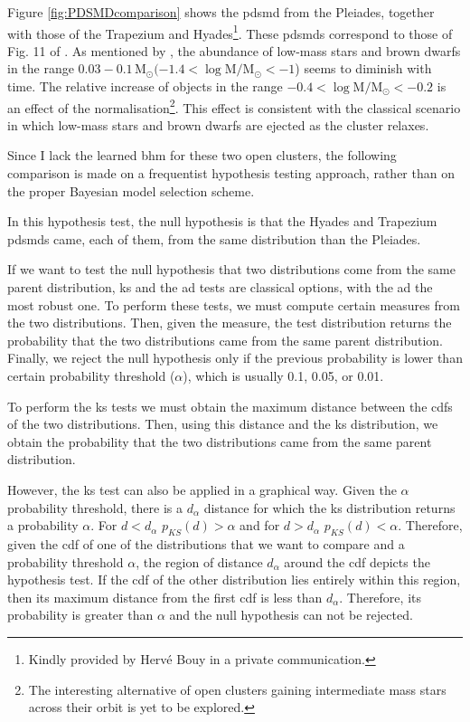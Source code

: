 Figure \ref{fig:PDSMDcomparison} shows the \gls{pdsmd} from the Pleiades, together with those of the Trapezium and Hyades\footnote{Kindly provided by Herv\'e Bouy in a private communication.}. These \glspl{pdsmd} correspond to those of  Fig. 11 of \citet{Bouy2015}. As mentioned by \citet{Bouy2015}, the abundance of low-mass stars and brown dwarfs in the range $0.03 - 0.1\,\mathrm{M_{\odot}}(-1.4 < \log \mathrm{M/M_{\odot}} <-1$) seems to diminish with time. The relative increase of objects in the range $-0.4 < \mathrm{\log M/M_{\odot}} < -0.2$ is an effect of the normalisation\footnote{The interesting alternative of open clusters gaining intermediate mass stars across their orbit is yet to be explored.}. This effect is consistent with the classical scenario in which low-mass stars and brown dwarfs are ejected as the cluster relaxes.

Since I lack the learned \gls{bhm} for these two open clusters, the following comparison is made on a frequentist hypothesis testing approach, rather than on the proper Bayesian model selection scheme.

In this hypothesis test, the null hypothesis is that the Hyades and Trapezium \glspl{pdsmd} came, each of them, from the same distribution than the Pleiades. 

If we want to test the null hypothesis that two distributions come from the same parent distribution, \gls{ks} and the \gls{ad} tests are classical options, with the \gls{ad} the most robust one. To perform these tests, we must compute certain measures from the two distributions. Then, given the measure, the test distribution returns the probability that the two distributions came from the same parent distribution. Finally, we reject the null hypothesis only if the previous probability is lower than certain probability threshold ($\alpha$), which is usually 0.1, 0.05, or 0.01. 

To perform the \gls{ks} tests we must obtain the maximum distance between the \glspl{cdf} of the two distributions. Then, using this distance and the \gls{ks} distribution, we obtain the probability that the two distributions came from the same parent distribution. %

However, the \gls{ks} test can also be applied in a graphical way. Given the $\alpha$ probability threshold, there is a $d_{\alpha}$ distance for which the \gls{ks} distribution returns a probability $\alpha$. For $d < d_{\alpha}$ $p_{KS}(d) > \alpha$ and for $d > d_{\alpha}$ $p_{KS}(d) < \alpha$. Therefore, given the \gls{cdf} of one of the distributions that we want to compare and a probability threshold $\alpha$, the region of distance $d_{\alpha}$ around the \gls{cdf} depicts the hypothesis test. If the \gls{cdf} of the other distribution lies entirely within this region, then its maximum distance from the first \gls{cdf} is less than $d_{\alpha}$. Therefore, its probability is greater than $\alpha$ and the null hypothesis can not be rejected.

